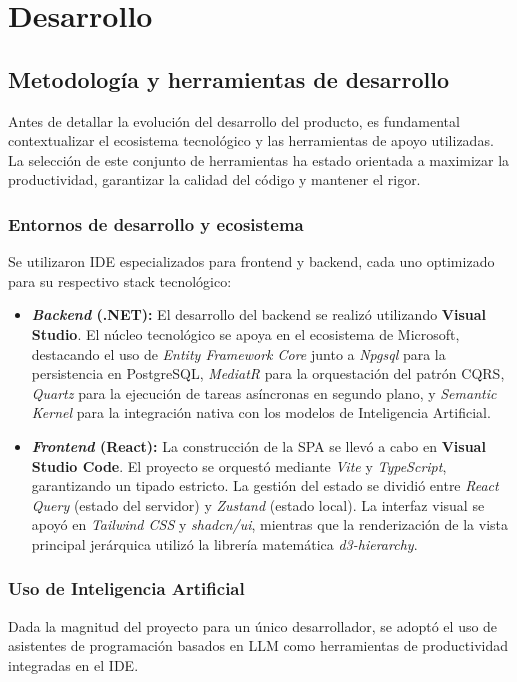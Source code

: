 \chapter{Desarrollo}
\label{chap:desarrollo}

\section{Metodología y herramientas de desarrollo}
Antes de detallar la evolución del desarrollo del producto, es fundamental contextualizar el ecosistema tecnológico y las herramientas de apoyo utilizadas. La selección de este conjunto de herramientas ha estado orientada a maximizar la productividad, garantizar la calidad del código y mantener el rigor.

\subsection{Entornos de desarrollo y ecosistema}
Se utilizaron \ac{IDE} especializados para frontend y backend, cada uno optimizado para su respectivo stack tecnológico:

\begin{itemize}
    \item \textbf{\emph{Backend} (.NET):} El desarrollo del backend se realizó utilizando \textbf{Visual Studio}. El núcleo tecnológico se apoya en el ecosistema de Microsoft, destacando el uso de \emph{Entity Framework Core} junto a \emph{Npgsql} para la persistencia en PostgreSQL, \emph{MediatR} para la orquestación del patrón \ac{CQRS}, \emph{Quartz} para la ejecución de tareas asíncronas en segundo plano, y \emph{Semantic Kernel} para la integración nativa con los modelos de Inteligencia Artificial.
    
    \item \textbf{\emph{Frontend} (React):} La construcción de la \ac{SPA} se llevó a cabo en \textbf{Visual Studio Code}. El proyecto se orquestó mediante \emph{Vite} y \emph{TypeScript}, garantizando un tipado estricto. La gestión del estado se dividió entre \emph{React Query} (estado del servidor) y \emph{Zustand} (estado local). La interfaz visual se apoyó en \emph{Tailwind CSS} y \emph{shadcn/ui}, mientras que la renderización de la vista principal jerárquica utilizó la librería matemática \emph{d3-hierarchy}.
\end{itemize}

\subsection{Uso de Inteligencia Artificial}
Dada la magnitud del proyecto para un único desarrollador, se adoptó el uso de asistentes de programación basados en \ac{LLM} como herramientas de productividad integradas en el \ac{IDE}. 

